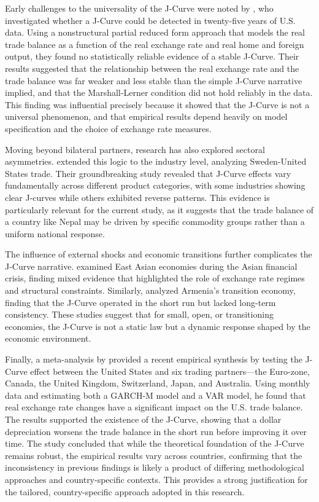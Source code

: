 \documentclass[12pt]{article}
\begin{document}
Early challenges to the universality of the J-Curve were noted by \textcite{Rose1989-bs}, who investigated whether a J-Curve could be detected in twenty-five years of U.S. data. Using a nonstructural partial reduced form approach that models the real trade balance as a function of the real exchange rate and real home and foreign output, they found no statistically reliable evidence of a stable J-Curve. Their results suggested that the relationship between the real exchange rate and the trade balance was far weaker and less stable than the simple J-Curve narrative implied, and that the Marshall-Lerner condition did not hold reliably in the data. This finding was influential precisely because it showed that the J-Curve is not a universal phenomenon, and that empirical results depend heavily on model specification and the choice of exchange rate measures.

Moving beyond bilateral partners, research has also explored sectoral asymmetries. \textcite{Bahmani-Oskooee2009-gm} extended this logic to the industry level, analyzing Sweden-United States trade. Their groundbreaking study revealed that J-Curve effects vary fundamentally across different product categories, with some industries showing clear J-curves while others exhibited reverse patterns. This evidence is particularly relevant for the current study, as it suggests that the trade balance of a country like Nepal may be driven by specific commodity groups rather than a uniform national response.

The influence of external shocks and economic transitions further complicates the J-Curve narrative. \textcite{Lal2002-ca} examined East Asian economies during the Asian financial crisis, finding mixed evidence that highlighted the role of exchange rate regimes and structural constraints. Similarly, \textcite{Grigoryan2015-gz} analyzed Armenia's transition economy, finding that the J-Curve operated in the short run but lacked long-term consistency. These studies suggest that for small, open, or transitioning economies, the J-Curve is not a static law but a dynamic response shaped by the economic environment.

Finally, a meta-analysis by \textcite{Kallianiotis2022-po} provided a recent empirical synthesis by testing the J-Curve effect between the United States and six trading partners—the Euro-zone, Canada, the United Kingdom, Switzerland, Japan, and Australia. Using monthly data and estimating both a GARCH-M model and a VAR model, he found that real exchange rate changes have a significant impact on the U.S. trade balance. The results supported the existence of the J-Curve, showing that a dollar depreciation worsens the trade balance in the short run before improving it over time. The study concluded that while the theoretical foundation of the J-Curve remains robust, the empirical results vary across countries, confirming that the inconsistency in previous findings is likely a product of differing methodological approaches and country-specific contexts. This provides a strong justification for the tailored, country-specific approach adopted in this research.
\end{document}
